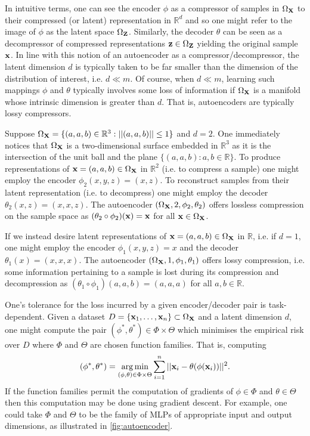\documentclass[11pt]{article}
\begin{document}
In intuitive terms, one can see the encoder $\phi$ as a compressor of samples in $\Omega_{\mathbf{X}}$ to their compressed (or latent) representation in $\mathbb{R}^d$ and so one might refer to the image of $\phi$ as the latent space $\Omega_{\mathbf{Z}}$. Similarly, the decoder $\theta$ can be seen as a decompressor of compressed representations $\mathbf{z}\in\Omega_{\mathbf{Z}}$ yielding the original sample $\mathbf{x}$. In line with this notion of an autoencoder as a compressor/decompressor, the latent dimension $d$ is typically taken to be far smaller than the dimension of the distribution of interest, i.e. $d\ll m$. Of course, when $d\ll m$, learning such mappings $\phi$ and $\theta$ typically involves some loss of information if $\Omega_{\mathbf{X}}$ is a manifold whose intrinsic dimension is greater than $d$. That is, autoencoders are typically lossy compressors.

\begin{example}
    Suppose $\Omega_{\mathbf{X}}=\{(a,a,b)\in\mathbb{R}^3:||(a,a,b)||\leq1\}$ and $d=2$. One immediately notices that $\Omega_{\mathbf{X}}$ is a two-dimensional surface embedded in $\mathbb{R}^3$ as it is the intersection of the unit ball and the plane $\{(a,a,b):a,b\in\mathbb{R}\}$. To produce representations of $\mathbf{x}=(a,a,b)\in\Omega_{\mathbf{X}}$ in $\mathbb{R}^2$ (i.e. to compress a sample) one might employ the encoder $\phi_2(x,y,z)=(x,z)$. To reconstruct samples from their latent representation (i.e. to decompress) one might employ the decoder $\theta_2(x,z)=(x,x,z)$. The autoencoder $(\Omega_{\mathbf{X}},2,\phi_2,\theta_2)$ offers lossless compression on the sample space as $(\theta_2\circ\phi_2)(\mathbf{x})=\mathbf{x}$ for all $\mathbf{x}\in\Omega_{\mathbf{X}}$.
    
    \hspace{15pt} If we instead desire latent representations of $\mathbf{x}=(a,a,b)\in\Omega_{\mathbf{X}}$ in $\mathbb{R}$, i.e. if $d=1$, one might employ the encoder $\phi_1(x,y,z)=x$ and the decoder $\theta_1(x)=(x,x,x)$. The autoencoder $(\Omega_{\mathbf{X}},1,\phi_1,\theta_1)$ offers lossy compression, i.e. some information pertaining to a sample is lost during its compression and decompression as $(\theta_1\circ\phi_1)(a,a,b)=(a,a,a)$ for all $a,b\in\mathbb{R}$.
\end{example}

One's tolerance for the loss incurred by a given encoder/decoder pair is task-dependent. Given a dataset $D=\{\mathbf{x}_1,\dots,\mathbf{x}_n\}\subset\Omega_{\mathbf{X}}$ and a latent dimension $d$, one might compute the pair $(\phi^*,\theta^*)\in\Phi\times\Theta$ which minimises the empirical risk over $D$ where $\Phi$ and $\Theta$ are chosen function families. That is, computing
$$
(\phi^*,\theta^*)
=
\operatorname*{arg\,min}_{(\phi,\theta)\in\Phi\times\Theta}
\sum_{i=1}^n||\mathbf{x}_i-\theta(\phi(\mathbf{x}_i))||^2.
$$
If the function families permit the computation of gradients of $\phi\in\Phi$ and $\theta\in\Theta$ then this computation may be done using gradient descent. For example, one could take $\Phi$ and $\Theta$ to be the family of MLPs of appropriate input and output dimensions, as illustrated in \autoref{fig:autoencoder}.
\end{document}
